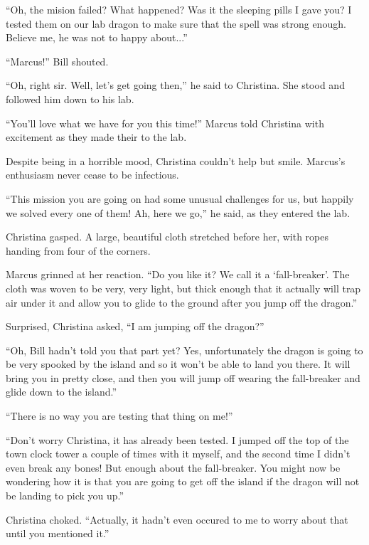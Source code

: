 \documentclass[showtrims,b6paper,draft,10pt]{memoir}
\begin{document}
``Oh, the mision failed?  What happened?  Was it the sleeping pills I gave you?  I tested them on our lab dragon to make sure that the spell was strong enough.  Believe me, he was not to happy about...''

``Marcus!''  Bill shouted.

``Oh, right sir.  Well, let's get going then,'' he said to Christina.  She stood and followed him down to his lab.

\timeskip

``You'll love what we have for you this time!'' Marcus told Christina with excitement as they made their to the lab.

Despite being in a horrible mood, Christina couldn't help but smile.  Marcus's enthusiasm never cease to be infectious.

``This mission you are going on had some unusual challenges for us, but happily we solved every one of them!  Ah, here we go,'' he said, as they entered the lab.

Christina gasped.  A large, beautiful cloth stretched before her, with ropes handing from four of the corners.

Marcus grinned at her reaction.  ``Do you like it?  We call it a `fall-breaker'.  The cloth was woven to be very, very light, but thick enough that it actually will trap air under it and allow you to glide to the ground after you jump off the dragon.''

Surprised, Christina asked,  ``I am jumping off the dragon?''

``Oh, Bill hadn't told you that part yet?  Yes, unfortunately the dragon is going to be very spooked by the island and so it won't be able to land you there.  It will bring you in pretty close, and then you will jump off wearing the fall-breaker and glide down to the island.''

``There is no way you are testing that thing on me!''

``Don't worry Christina, it has already been tested.  I jumped off the top of the town clock tower a couple of times with it myself, and the second time I didn't even break any bones!  But enough about the fall-breaker.  You might now be wondering how it is that you are going to get off the island if the dragon will not be landing to pick you up.''

Christina choked.  ``Actually, it hadn't even occured to me to worry about that until you mentioned it.''
\end{document}

